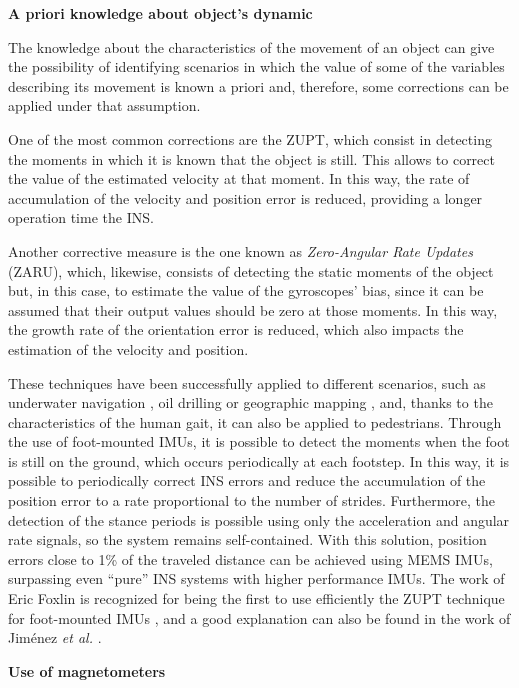 \begin{description}
	\item \textbf{A priori knowledge about object's dynamic}
	
	The knowledge about the characteristics of the movement of an object can give the possibility of identifying scenarios in which the value of some of the variables describing its movement is known a priori and, therefore, some corrections can be applied under that assumption.

	One of the most common corrections are the ZUPT, which consist in detecting the moments in which it is known that the object is still. This allows to correct the value of the estimated velocity at that moment. In this way, the rate of accumulation of the velocity and position error is reduced, providing a longer operation time the INS.

	Another corrective measure is the one known as \emph{Zero-Angular Rate Updates} (ZARU), which, likewise, consists of detecting the static moments of the object but, in this case, to estimate the value of the gyroscopes' bias, since it can be assumed that their output values should be zero at those moments. In this way, the growth rate of the orientation error is reduced, which also impacts the estimation of the velocity and position.
	
	These techniques have been successfully applied to different scenarios, such as underwater navigation \cite{huddle_trends_1998}, oil drilling \cite{ledroz_fog-based_2005} or geographic mapping \cite{grejner-brzezinska_bridging_2001}, and, thanks to the characteristics of the human gait, it can also be applied to pedestrians.
	Through the use of foot-mounted IMUs, it is possible to detect the moments when the foot is still on the ground, which occurs periodically at each footstep.
	In this way, it is possible to periodically correct INS errors and reduce the accumulation of the position error to a rate proportional to the number of strides.
	Furthermore, the detection of the stance periods is possible using only the acceleration and angular rate signals, so the system remains self-contained.
	With this solution, position errors close to 1\% of the traveled distance can be achieved using MEMS IMUs, surpassing even ``pure'' INS systems with higher performance IMUs.
	The work of Eric Foxlin is recognized for being the first to use efficiently the ZUPT technique for foot-mounted IMUs \cite{foxlin_pedestrian_2005}, and a good explanation can also be found in the work of Jiménez \emph{et al.} \cite{jimenez_indoor_2010}.	
	\item \textbf{Use of magnetometers}
		

\end{description}
